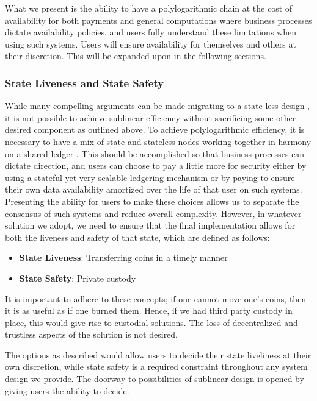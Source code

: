 \documentclass[peerreview]{ieeesyscoin}
\begin{document}
What we present is the ability to have a polylogarithmic chain at the cost of availability for both payments and general computations where business processes dictate availability policies, and users fully understand these limitations when using such systems. Users will ensure availability for themselves and others at their discretion.  This will be expanded upon in the following sections.

\subsubsection{State Liveness and State Safety}

While many compelling arguments can be made migrating to a state-less design \cite{Hot19}, it is not possible to achieve sublinear efficiency without sacrificing some other desired component as outlined above. To achieve polylogarithmic efficiency, it is necessary to have a mix of state and stateless nodes working together in harmony on a shared ledger \cite{Hot19}. This should be accomplished so that business processes can dictate direction, and users can choose to pay a little more for security either by using a stateful yet very scalable ledgering mechanism or by paying to ensure their own data availability amortized over the life of that user on such systems. Presenting the ability for users to make these choices allows us to separate the consensus of such systems and reduce overall complexity. However, in whatever solution we adopt, we need to ensure that the final implementation allows for both the liveness and safety of that state, which are defined as follows:

\begin{itemize}
\item \textbf{State Liveness}: Transferring coins in a timely manner
\item \textbf{State Safety}:  Private custody
\end{itemize}

It is important to adhere to these concepts; if one cannot move one’s coins, then it is as useful as if one burned them. Hence, if we had third party custody in place, this would give rise to custodial solutions. The loss of decentralized and trustless aspects of the solution is not desired. 

The options as described would allow users to decide their state liveliness at their own discretion, while state safety is a required constraint throughout any system design we provide. The doorway to possibilities of sublinear design is opened by giving users the ability to decide.
\end{document}
